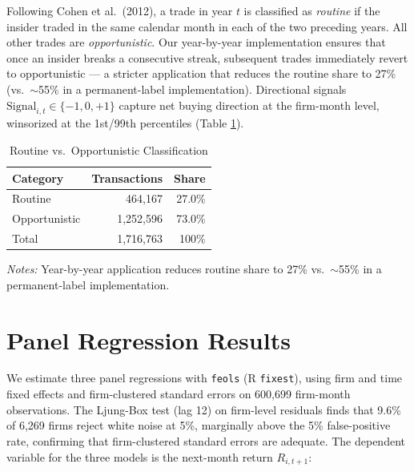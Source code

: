 \documentclass{article}
\begin{document}
Following Cohen et al.\ (2012), a trade in year $t$ is classified as \textit{routine} if the insider traded in the same calendar month in each of the two preceding years. All other trades are \textit{opportunistic}. Our year-by-year implementation ensures that once an insider breaks a consecutive streak, subsequent trades immediately revert to opportunistic --- a stricter application that reduces the routine share to 27\% (vs.\ $\sim$55\% in a permanent-label implementation). Directional signals $\text{Signal}_{i,t} \in \{-1, 0, +1\}$ capture net buying direction at the firm-month level, winsorized at the 1st/99th percentiles (Table \ref{tab:classification}).

\begin{table}[h!]
\centering
\caption{Routine vs.\ Opportunistic Classification}
\label{tab:classification}
\small
\begin{tabular}{lrr}
\toprule
Category & Transactions & Share \\
\midrule
Routine       & 464,167   & 27.0\% \\
Opportunistic & 1,252,596 & 73.0\% \\
Total         & 1,716,763 & 100\%  \\
\bottomrule
\end{tabular}
\begin{minipage}{\linewidth}
\vspace{2pt}
\small\textit{Notes:} Year-by-year application reduces routine share to 27\% vs.\ $\sim$55\% in a permanent-label implementation.
\end{minipage}
\end{table}

\section{Panel Regression Results}

We estimate three panel regressions with \texttt{feols} (R \texttt{fixest}), using firm and time fixed effects and firm-clustered standard errors on 600,699 firm-month observations. The Ljung-Box test (lag 12) on firm-level residuals finds that 9.6\% of 6,269 firms reject white noise at 5\%, marginally above the 5\% false-positive rate, confirming that firm-clustered standard errors are adequate. The dependent variable for the three models is the next-month return $R_{i,t+1}$:
\end{document}
